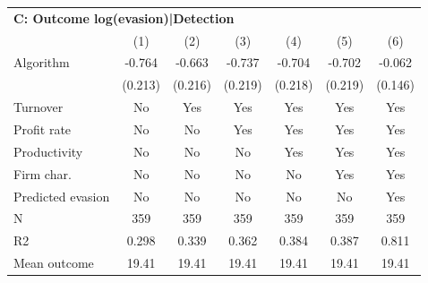 \begin{tabular}{lcccccc}
\midrule \multicolumn{7}{l}{\textbf{C: Outcome log(evasion)|Detection}} \\ \multicolumn{1}{l}{} & (1) & (2) & (3) & (4) & (5) & (6) \\ \midrule
Algorithm   &      -0.764\sym{***}&      -0.663\sym{***}&      -0.737\sym{***}&      -0.704\sym{***}&      -0.702\sym{***}&      -0.062         \\
            &     (0.213)         &     (0.216)         &     (0.219)         &     (0.218)         &     (0.219)         &     (0.146)         \\
\midrule
Turnover    &          No         &         Yes         &         Yes         &         Yes         &         Yes         &         Yes         \\
Profit rate &          No         &          No         &         Yes         &         Yes         &         Yes         &         Yes         \\
Productivity&          No         &          No         &          No         &         Yes         &         Yes         &         Yes         \\
Firm char.  &          No         &          No         &          No         &          No         &         Yes         &         Yes         \\
Predicted evasion&          No         &          No         &          No         &          No         &          No         &         Yes         \\
N           &         359         &         359         &         359         &         359         &         359         &         359         \\
R2          &       0.298         &       0.339         &       0.362         &       0.384         &       0.387         &       0.811         \\
Mean outcome&       19.41         &       19.41         &       19.41         &       19.41         &       19.41         &       19.41         \\
\bottomrule \end{tabular}
